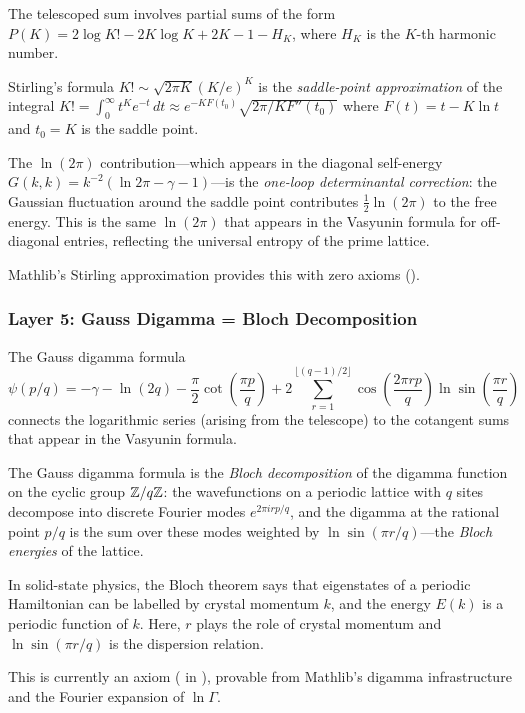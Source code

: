 \documentclass[11pt,a4paper]{article}
\begin{document}
The telescoped sum involves partial sums of the form
$P(K) = 2\log K! - 2K\log K + 2K - 1 - H_K$, where $H_K$ is
the $K$-th harmonic number.

\begin{correspondence}
Stirling's formula $K! \sim \sqrt{2\pi K}(K/e)^K$ is the
\emph{saddle-point approximation} of the integral
$K! = \int_0^\infty t^K e^{-t}\,dt \approx e^{-KF(t_0)}\sqrt{2\pi/KF''(t_0)}$
where $F(t) = t - K\ln t$ and $t_0 = K$ is the saddle point.

The $\ln(2\pi)$ contribution---which appears in the diagonal self-energy
$G(k,k) = k^{-2}(\ln 2\pi - \gamma - 1)$---is the \emph{one-loop
determinantal correction}: the Gaussian fluctuation around the saddle
point contributes $\tfrac{1}{2}\ln(2\pi)$ to the free energy.
This is the same $\ln(2\pi)$ that appears in the Vasyunin formula
for off-diagonal entries, reflecting the universal entropy of the
prime lattice.

Mathlib's Stirling approximation provides this with zero axioms
().
\end{correspondence}

\subsubsection{Layer 5: Gauss Digamma = Bloch Decomposition}

The Gauss digamma formula
\[
  \psi(p/q) = -\gamma - \ln(2q) - \frac{\pi}{2}\cot\left(\frac{\pi p}{q}\right)
  + 2\sum_{r=1}^{\lfloor(q-1)/2\rfloor} \cos\left(\frac{2\pi rp}{q}\right)
  \ln\sin\left(\frac{\pi r}{q}\right)
\]
connects the logarithmic series (arising from the telescope) to the
cotangent sums that appear in the Vasyunin formula.

\begin{correspondence}
The Gauss digamma formula is the \emph{Bloch decomposition} of the
digamma function on the cyclic group $\mathbb{Z}/q\mathbb{Z}$: the wavefunctions on
a periodic lattice with $q$ sites decompose into discrete Fourier
modes $e^{2\pi irp/q}$, and the digamma at the rational point $p/q$
is the sum over these modes weighted by $\ln\sin(\pi r/q)$---the
\emph{Bloch energies} of the lattice.

In solid-state physics, the Bloch theorem says that eigenstates of
a periodic Hamiltonian can be labelled by crystal momentum $k$,
and the energy $E(k)$ is a periodic function of $k$. Here,
$r$ plays the role of crystal momentum and $\ln\sin(\pi r/q)$
is the dispersion relation.

This is currently an axiom ( in
), provable from Mathlib's digamma
infrastructure and the Fourier expansion of $\ln\Gamma$.
\end{correspondence}
\end{document}
